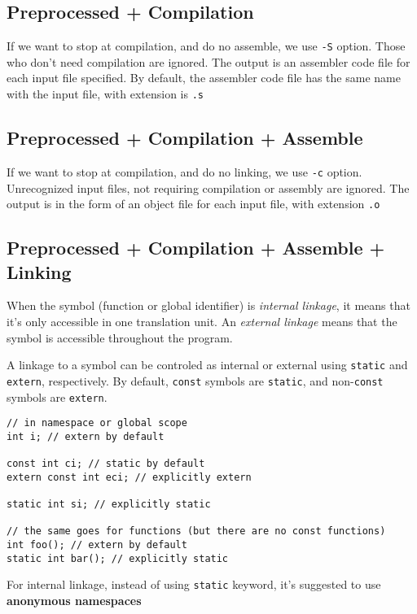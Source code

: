 \subsection{Preprocessed + Compilation}

If we want to stop at compilation, and do no assemble, we use \verb!-S! option.
Those who don't need compilation are ignored. The output is an assembler code
file for each input file specified. By default, the assembler code file has the
same name with the input file, with extension is \verb!.s!


\subsection{Preprocessed + Compilation + Assemble}

If we want to stop at compilation, and do no linking, we use \verb!-c! option.
Unrecognized input files, not requiring compilation or assembly are ignored. The
output is in the form of an object file for each input file, with extension
\verb!.o!


\subsection{Preprocessed + Compilation + Assemble + Linking}
\label{sec:preprocessed_compile_assemble_linking}

When the symbol (function or global identifier) is {\it internal linkage}, it means that it's
only accessible in one translation unit. An {\it external linkage} means that
the symbol is accessible throughout the program.

A linkage to a symbol can be controled as internal or external using
\verb!static! and \verb!extern!, respectively. By default, \verb!const! symbols
are \verb!static!, and non-\verb!const! symbols are \verb!extern!.

\begin{verbatim}
// in namespace or global scope
int i; // extern by default

const int ci; // static by default
extern const int eci; // explicitly extern

static int si; // explicitly static

// the same goes for functions (but there are no const functions)
int foo(); // extern by default
static int bar(); // explicitly static 
\end{verbatim}

For internal linkage, instead of using \verb!static! keyword, it's suggested to
use {\bf anonymous namespaces}

